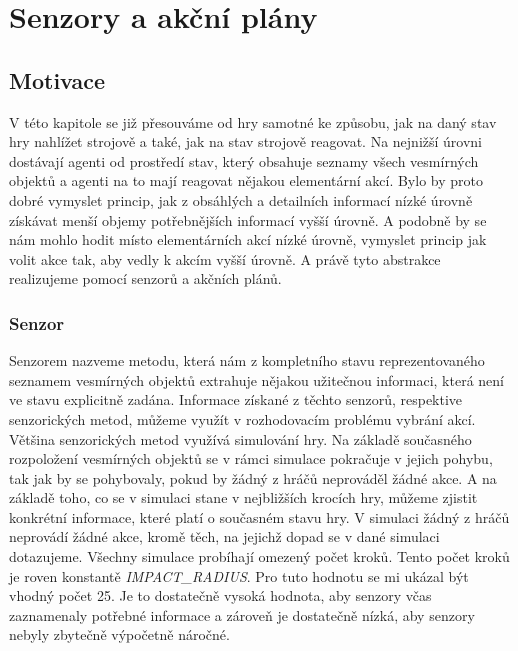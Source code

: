 \chapter{Senzory a akční plány}

\section{Motivace}
V této kapitole se již přesouváme od hry samotné ke způsobu, jak na daný stav hry nahlížet strojově a také, jak na stav strojově reagovat. 
Na nejnižší úrovni dostávají agenti od prostředí stav, který obsahuje seznamy všech vesmírných objektů a agenti na to mají reagovat nějakou elementární akcí.
Bylo by proto dobré vymyslet princip, jak z obsáhlých a detailních informací nízké úrovně získávat menší objemy potřebnějších informací vyšší úrovně. 
A podobně by se nám mohlo hodit místo elementárních akcí nízké úrovně, vymyslet princip jak volit akce tak, aby vedly k akcím vyšší úrovně.
A právě tyto abstrakce realizujeme pomocí senzorů a akčních plánů.
\subsection{Senzor}

Senzorem nazveme metodu, která nám z kompletního stavu reprezentovaného seznamem vesmírných objektů extrahuje nějakou užitečnou informaci, která není ve stavu explicitně zadána.
Informace získané z těchto senzorů, respektive senzorických metod, můžeme využít v rozhodovacím problému vybrání akcí.
Většina senzorických metod využívá simulování hry. Na základě současného rozpoložení vesmírných objektů se v rámci simulace pokračuje v jejich pohybu, tak jak by se pohybovaly, pokud by žádný z hráčů neprováděl žádné akce.
A na základě toho, co se v simulaci stane v nejbližších krocích hry, můžeme zjistit konkrétní informace, které platí o současném stavu hry.
V simulaci žádný z hráčů neprovádí žádné akce, kromě těch, na jejichž dopad se v dané simulaci dotazujeme.
Všechny simulace probíhají omezený počet kroků. Tento počet kroků je roven konstantě \emph{\uppercase{Impact\_radius}}. Pro tuto hodnotu se mi ukázal být vhodný počet 25.
Je to dostatečně vysoká hodnota, aby senzory včas zaznamenaly potřebné informace a zároveň je dostatečně nízká, aby senzory nebyly zbytečně výpočetně náročné.


